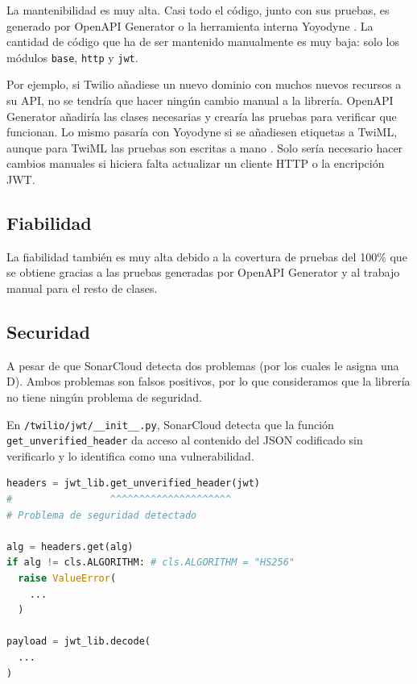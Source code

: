 \documentclass{article}
\begin{document}
La mantenibilidad es muy alta.
Casi todo el código, junto con sus pruebas,
es generado por OpenAPI Generator
\cite{twilio-generated-openapi}
o la herramienta interna Yoyodyne
\cite{twilio-generated-yoyodyne}.
La cantidad de código que ha de ser mantenido manualmente es muy baja:
solo los módulos \verb|base|, \verb|http| y \verb|jwt|.

Por ejemplo,
si Twilio añadiese un nuevo dominio con muchos nuevos recursos a su API,
no se tendría que hacer ningún cambio manual a la librería.
OpenAPI Generator añadiría las clases necesarias
y crearía las pruebas para verificar que funcionan.
Lo mismo pasaría con Yoyodyne si se añadiesen etiquetas a TwiML,
aunque para TwiML las pruebas son escritas a mano
\cite{twilio-twiml-manual-tests}.
Solo sería necesario hacer cambios manuales si hiciera falta actualizar
un cliente HTTP o la encripción JWT.


\subsection{Fiabilidad}

La fiabilidad también es muy alta
debido a la covertura de pruebas del 100\%
que se obtiene gracias a las pruebas generadas por OpenAPI Generator
y al trabajo manual para el resto de clases.

\subsection{Securidad}

A pesar de que SonarCloud detecta dos problemas
(por los cuales le asigna una D).
Ambos problemas son falsos positivos, 
por lo que consideramos que la librería no tiene ningún problema de seguridad.

\hfill

En \verb|/twilio/jwt/__init__.py|,
SonarCloud detecta que la función
\verb|get_unverified_header|
da acceso al contenido del JSON codificado sin verificarlo
y lo identifica como una vulnerabilidad.

\begin{lstlisting}[language=Python]
headers = jwt_lib.get_unverified_header(jwt)
#                 ^^^^^^^^^^^^^^^^^^^^^
# Problema de seguridad detectado

alg = headers.get(alg)
if alg != cls.ALGORITHM: # cls.ALGORITHM = "HS256"
  raise ValueError(
    ...
  )

payload = jwt_lib.decode(
  ...
)
\end{lstlisting}
\end{document}
